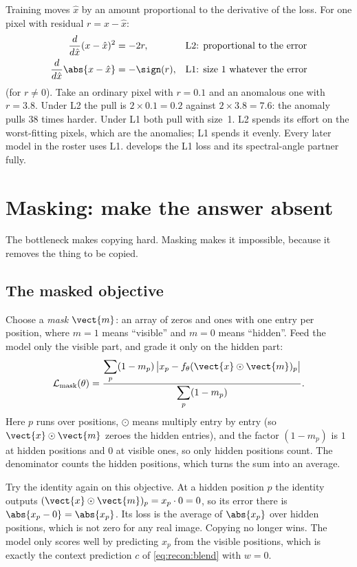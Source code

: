 Training moves $\hat{x}$ by an amount proportional to the derivative of the loss. For one pixel with
residual $r = x - \hat{x}$:
\begin{align*}
\frac{d}{d\hat{x}}(x-\hat{x})^2 &= -2r, &&\text{L2: proportional to the error}\\
\frac{d}{d\hat{x}}\abs{x-\hat{x}} &= -\sign(r), &&\text{L1: size 1 whatever the error}
\end{align*}
(for $r\ne 0$). Take an ordinary pixel with $r=0.1$ and an anomalous one with $r=3.8$. Under L2 the
pull is $2\times0.1=0.2$ against $2\times3.8=7.6$: the anomaly pulls $38$ times harder. Under L1 both
pull with size~1. L2 spends its effort on the worst-fitting pixels, which are the anomalies; L1 spends
it evenly. Every later model in the roster uses L1.  develops the L1 loss and its
spectral-angle partner fully.

\section{Masking: make the answer absent}\label{sec:recon:masking}

The bottleneck makes copying hard. Masking makes it impossible, because it removes the thing to be
copied.

\subsection{The masked objective}

Choose a \emph{mask} $\vect{m}$: an array of zeros and ones with one entry per position,
where $m=1$ means ``visible'' and $m=0$ means ``hidden''. Feed the model only the visible part, and
grade it only on the hidden part:
\begin{equation}\label{eq:recon:masked}
\mathcal{L}_{\text{mask}}(\theta) =
\frac{\displaystyle\sum_{p} (1-m_p)\,\bigl\lvert x_p - f_\theta(\vect{x}\odot\vect{m})_p\bigr\rvert}
     {\displaystyle\sum_{p}(1-m_p)} .
\end{equation}
Here $p$ runs over positions, $\odot$ means multiply entry by entry (so $\vect{x}\odot\vect{m}$ zeroes
the hidden entries), and the factor $(1-m_p)$ is $1$ at hidden positions and $0$ at visible ones, so
only hidden positions count. The denominator counts the hidden positions, which turns the sum into an
average.

Try the identity again on this objective. At a hidden position $p$ the identity outputs
$(\vect{x}\odot\vect{m})_p = x_p\cdot 0 = 0$, so its error there is $\abs{x_p - 0} = \abs{x_p}$. Its
loss is the average of $\abs{x_p}$ over hidden positions, which is not zero for any real image. Copying
no longer wins. The model only scores well by predicting $x_p$ from the visible positions, which is
exactly the context prediction $c$ of \cref{eq:recon:blend} with $w=0$.

